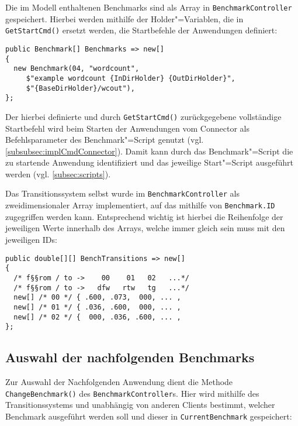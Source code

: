 Die im Modell enthaltenen Benchmarks sind als Array in \texttt{BenchmarkController} gespeichert.
Hierbei werden mithilfe der Holder"=Variablen, die in \texttt{GetStartCmd()} ersetzt werden, die Startbefehle der Anwendungen definiert:

\begin{lstlisting}[label=lst:benchmarkDefinition,style=cs,
caption={[Definition der verfügbaren Benchmarks im BenchmarkController]
    Definition der verfügbaren Benchmarks im \texttt{BenchmarkController} (gekürzt)}]
public Benchmark[] Benchmarks => new[]
{
  new Benchmark(04, "wordcount",
     $"example wordcount {InDirHolder} {OutDirHolder}",
     $"{BaseDirHolder}/wcout"),
};
\end{lstlisting}

Der hierbei definierte und durch \texttt{GetStartCmd()} zurückgegebene vollständige Startbefehl wird beim Starten der Anwendungen vom Connector als Befehlsparameter des Benchmark"=Script genutzt (vgl. \cref{subsubsec:implCmdConnector}).
Damit kann durch das Benchmark"=Script die zu startende Anwendung identifiziert und das jeweilige Start"=Script ausgeführt werden (vgl. \cref{subsec:scripts}).

Das Transitionssystem selbst wurde im \texttt{BenchmarkController} als zweidimensionaler Array implementiert, auf das mithilfe von \texttt{Benchmark.ID} zugegriffen werden kann.
Entsprechend wichtig ist hierbei die Reihenfolge der jeweiligen Werte innerhalb des Arrays, welche immer gleich sein muss mit den jeweiligen IDs:

\begin{lstlisting}[label=lst:transitionSystemImpl,style=cs,
caption={[Implementierung des Transitionssystems im BenchmarkController]
    Implementierung des Transitionssystems im \texttt{BenchmarkController} (gekürzt)}]
public double[][] BenchTransitions => new[]
{
  /* f§§rom / to ->    00    01   02   ...*/
  /* f§§rom / to ->   dfw   rtw   tg   ...*/
  new[] /* 00 */ { .600, .073,  000, ... ,
  new[] /* 01 */ { .036, .600,  000, ... ,
  new[] /* 02 */ {  000, .036, .600, ... ,
};
\end{lstlisting}

\subsection{Auswahl der nachfolgenden Benchmarks}
\label{subsec:selectionNextBenchmark}

Zur Auswahl der Nachfolgenden Anwendung dient die Methode \texttt{ChangeBenchmark()} des \texttt{BenchmarkController}s.
Hier wird mithilfe des Transitionssystems und unabhängig von anderen Clients bestimmt, welcher Benchmark ausgeführt werden soll und dieser in \texttt{CurrentBenchmark} gespeichert:

